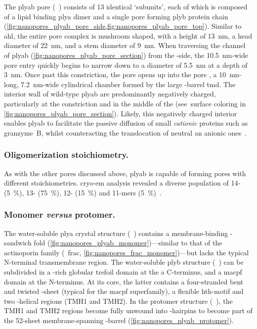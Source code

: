 The \gls{plyab} pore (~\cite{Lukoyanova-Kondos-2015}) consists of 13 identical `subunits', each of
which is composed of a lipid binding \gls{plya} dimer and a single pore forming \gls{plyb} protein chain
(\cref{fig:nanopores_plyab_pore_side,fig:nanopores_plyab_pore_top}). Similar to \gls{ahl}, the entire pore
complex is mushroom shaped, with a height of \SI{13}{\nm}, a head diameter of \SI{22}{\nm}, and a stem
diameter of \SI{9}{\nm}. When traversing the channel of \gls{plyab} (\cref{fig:nanopores_plyab_pore_section})
from the \cisi{}-side, the \SI{10.5}{\nm}-wide pore entry quickly begins to narrow down to a diameter of
\SI{5.5}{\nm} at a depth of \SI{3}{\nm}. Once past this constriction, the pore opens up into the pore
\lumen{}, a \SI{10}{\nm}-long, \SI{7.2}{\nm}-wide cylindrical chamber formed by the large \tb-barrel
\gls{tmd}. The interior wall of wild-type \gls{plyab} are predominantly negatively charged, particularly at
the constriction and in the middle of the \lumen{} (see~surface coloring in
\cref{fig:nanopores_plyab_pore_section}). Likely, this negatively charged interior enables \gls{plyab} to
facilitate the passive diffusion of small \emph{cationic} proteins such as granzyme~B, whilst counteracting
the translocation of neutral an anionic ones~\cite{Stewart-2014,Reboul-2016}.


\subsubsection{Oligomerization stoichiometry.}
%

As with the other pores discussed above, \gls{plyab} is capable of forming pores with different
stoichiometries. \Gls{cryo-em} analysis revealed a diverse population of 14- (\SI{5}{\percent}), 13-
(\SI{75}{\percent}), 12- (\SI{15}{\percent}) and 11-mers (\SI{5}{\percent})~\cite{Lukoyanova-Kondos-2015}.


\subsubsection{Monomer \textit{versus} protomer.}
%

The water-soluble \gls{plya} crystal structure (~\cite{Lukoyanova-Kondos-2015}) contains a
membrane-binding \tb-sandwich fold (\cref{fig:nanopores_plyab_monomer})---similar to that of the actinoporin
family (\eg~\gls{frac}, \cref{fig:nanopores_frac_monomer})---but lacks the typical N-terminal transmembrane
region. The water-soluble \gls{plyb} structure (~\cite{Lukoyanova-Kondos-2015}) can be subdivided
in a \tb-rich globular trefoil domain at the a C-terminus, and a \gls{macpf} domain at the N-terminus. At its
core, the latter contains a four-stranded bent and twisted \tb-sheet (typical for the \gls{macpf}
superfamily), a flexible \gls{hth}-motif and two \ta-helical regions ({TMH1} and {TMH2}). In the protomer
structure (~\cite{Lukoyanova-Kondos-2015}), the {TMH1} and {TMH2} regions become fully unwound
into \tb-hairpins to become part of the 52-sheet membrane-spanning \tb-barrel
(\cref{fig:nanopores_plyab_protomer}).



